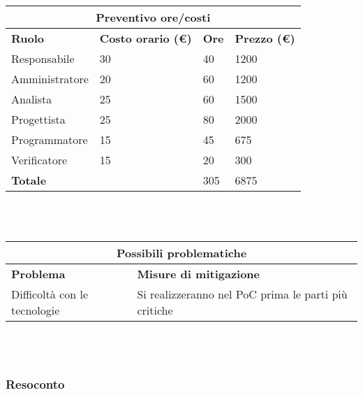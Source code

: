 \documentclass[a4paper, 12pt]{article}
\begin{document}
\begin{center}
    \begin{tabularx}{\textwidth}{|X|X|X|X|}
        \hline
        \multicolumn{4}{|c|}{\textbf{Preventivo ore/costi}}\\
        \hline
        \hline
        \textbf{Ruolo} & \textbf{Costo orario (\euro)} & \textbf{Ore} & \textbf{Prezzo (\euro)}\\
        \hline
        Responsabile    & 30 & 40  & 1200\\
        \hline
        Amministratore  & 20 & 60  & 1200\\
        \hline
        Analista        & 25 & 60  & 1500\\
        \hline
        Progettista     & 25 & 80  & 2000\\
        \hline
        Programmatore   & 15 & 45  & 675\\
        \hline
        Verificatore    & 15 & 20  & 300\\
        \hline
        \hline
        \textbf{Totale} &    & 305 & 6875\\
        \hline
    \end{tabularx}\\[8pt]
    \mbox{}\\
\end{center}

\begin{center}
    \begin{tabularx}{\textwidth}{|X|X|}
        \hline
        \multicolumn{2}{|c|}{\textbf{Possibili problematiche}}\\
        \hline
        \hline
        \textbf{Problema} & \textbf{Misure di mitigazione}\\
        \hline
        Difficoltà con le tecnologie & Si realizzeranno nel PoC prima le parti più critiche\\
        \hline
    \end{tabularx}\\[8pt]
    \mbox{}\\
\end{center}

\subsubsection{Resoconto}\mbox{}
\end{document}
